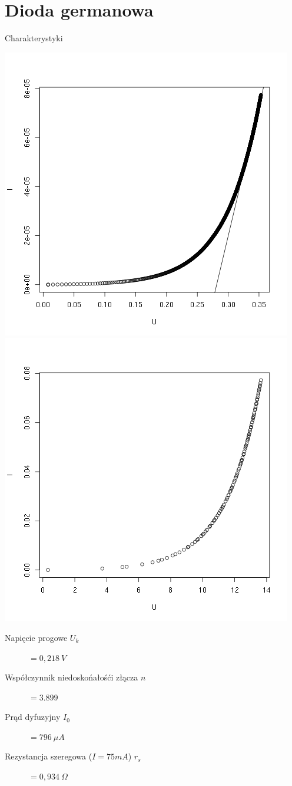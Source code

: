 \documentclass[11pt]{article}
\begin{document}
\section{Dioda germanowa}
Charakterystyki 
\begin{center}
\includegraphics[scale=0.48]{out/germanowa-normal.png}
\includegraphics[scale=0.48]{out/germanowa-log.png}
\end{center}
\begin{description}
\item[Napięcie progowe $U_k$] $=0,218\ V$
\item[Współczynnik niedoskońałośći złącza $n$]  $=3.899$
\item[Prąd dyfuzyjny $I_0$ ] $=796\ \mu A$
\item[Rezystancja szeregowa ($I=75mA$) $r_s$ ] $=0,934\ \Omega$
\end{description}
\end{document}
